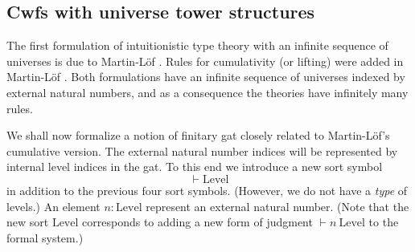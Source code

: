 \documentclass{lmcs}
\newcommand{\Level}{\mathrm{Level}}
\begin{document}
\subsection{Cwfs with universe tower structures} 

The first formulation of intuitionistic type theory with an infinite sequence of universes is due to Martin-Löf
\cite{martinlof:predicative}. Rules for cumulativity (or lifting) were added in Martin-Löf \cite{martinlof:hannover}. Both formulations have an infinite sequence of universes indexed by external natural numbers, and as a consequence the theories have infinitely many rules. 

We shall now formalize a notion of finitary gat closely related to Martin-Löf's cumulative version. The external natural number indices will be represented by internal level indices in the gat. To this end we introduce a new sort symbol 
$$
\vdash \Level
$$
in addition to the previous four sort symbols. (However, we do not have a {\em type} of levels.) An element $n : \Level$ represent an external natural number. (Note that the new sort $\Level$ corresponds to adding a new form of judgment $\vdash n\  \Level$ to the formal system.)
\end{document}
